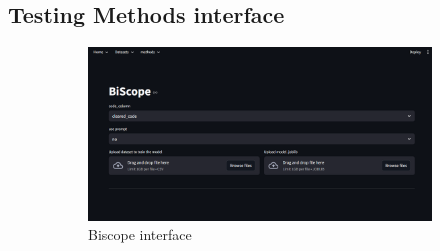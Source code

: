 \subsection{Testing Methods interface}
\begin{figure}[H]
    \centering
    \begin{subfigure}[t]{0.45\textwidth}
        \centering
        \includegraphics[width=\linewidth]{img/interfaccia/Screenshot 2025-09-27 172640.png}
        \caption{Biscope interface}
        \label{fig:errit}
    \end{subfigure}
    \hfill
    \begin{subfigure}[t]{0.45\textwidth}
        \centering

\end{subfigure}
\end{figure}
